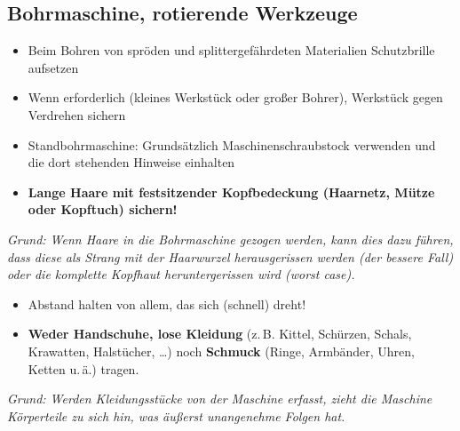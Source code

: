 \documentclass[13pt]{\basedir/fablab-document}
\begin{document}
\subsection{Bohrmaschine, rotierende Werkzeuge}



\begin{itemize}
	\item Beim Bohren von spröden und splittergefährdeten Materialien Schutzbrille aufsetzen
	\item Wenn erforderlich (kleines Werkstück oder großer Bohrer), Werkstück gegen Verdrehen sichern
	\item Standbohrmaschine: Grundsätzlich Maschinenschraubstock verwenden und die dort stehenden Hinweise einhalten
	\item \textbf{Lange Haare mit festsitzender Kopfbedeckung (Haarnetz, Mütze oder Kopftuch) sichern!}
\end{itemize}
\textit{Grund: Wenn Haare in die Bohrmaschine gezogen werden, kann dies dazu führen, dass diese als Strang mit der Haarwurzel herausgerissen werden (der bessere Fall) oder die komplette Kopfhaut heruntergerissen wird (worst case).}

\begin{itemize}
	\item Abstand halten von allem, das sich (schnell) dreht!
	\item \textbf{Weder Handschuhe, lose Kleidung} (z.\,B. Kittel, Schürzen, Schals, Krawatten, Halstücher, \dots) noch \textbf{Schmuck} (Ringe, Arm\-bänder, Uhren, Ketten u.\,ä.) tragen.
\end{itemize}
\textit{Grund: Werden Kleidungsstücke von der Maschine erfasst, zieht die Maschine Körperteile zu sich hin, was äußerst unangenehme Folgen hat.}
\end{document}
